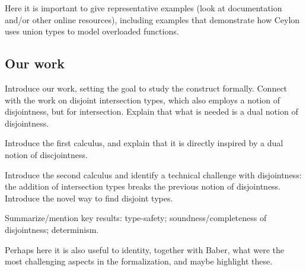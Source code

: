Here it is important to give representative examples (look at documentation
and/or other online resources), including examples
that demonstrate how Ceylon uses union types to model overloaded functions.

\subsection{Our work}


Introduce our work, setting the goal to study the construct formally.
Connect with the work on disjoint intersection types, which also
employs a notion of disjointness, but for intersection. Explain that
what is needed is a dual notion of disjointness.

Introduce the first calculus, and explain that it is directly inspired
by a dual notion of discjointness.

Introduce the second calculus and identify a technical challenge with
disjointness: the addition of intersection types breaks the previous
notion of disjointness. Introduce the novel way to find disjoint types.

Summarize/mention key results: type-safety; soundness/completeness of
disjointness; determinism.

Perhaps here it is also useful to identity, together with Baber, what
were the most challenging aspects in the formalization, and maybe
highlight these.


